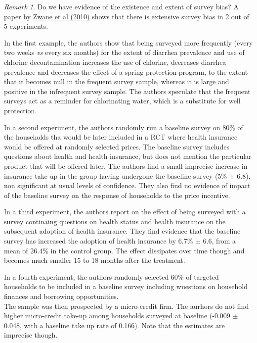 \documentclass[
]{book}
\theoremstyle{definition}
\theoremstyle{definition}
\theoremstyle{definition}
\theoremstyle{definition}
\theoremstyle{remark}
\newtheorem*{remark}{Remark}
\begin{document}
\begin{remark}
\iffalse{} {Remark. } \fi{}Do we have evidence of the existence and extent of survey bias?
A paper by \href{https://www.pnas.org/content/108/5/1821.short}{Zwane et al (2010)} shows that there is extensive survey bias in 2 out of 5 experiments.

In the first example, the authors show that being surveyed more frequently (every two weeks \emph{vs} every six months) for the extent of diarrhea prevalence and use of chlorine decontamination increases the use of chlorine, decreases diarrhea prevalence and decreases the effect of a spring protection program, to the extent that it becomes null in the frequent survey sample, whereas it is large and positive in the infrequent survey sample.
The authors speculate that the frequent surveys act as a reminder for chlorinating water, which is a substitute for well protection.

In a second experiment, the authors randomly run a baseline survey on 80\% of the households tha would be later included in a RCT where health insurance would be offered at randomly selected prices.
The baseline survey includes questions about health and health insurance, but does not mention the particular product that will be offered later.
The authors find a small imprecise increase in insurance take up in the group having undergone the baseline survey (5\% \(\pm\) 6.8), non significant at usual levels of confidence.
They also find no evidence of impact of the baseline survey on the response of households to the price incentive.

In a third experiment, the authors report on the effect of being surveyed with a survey continaing questions on health status and health insurance on the subsequent adoption of health insurance.
They find evidence that the baseline survey has increased the adoption of health insurance by 6.7\% \(\pm\) 6.6, from a mean of 26.4\% in the control group.
The effect dissipates over time though and becomes much smaller 15 to 18 months after the treatment.

In a fourth experiment, the authors randomly selected 60\% of targeted households to be included in a baseline survey including wuestions on household finances and borrowing opportunities.\\
The sample was then prospected by a micro-credit firm.
The aurhors do not find higher micro-credit take-up among households surveyed at baseline (-0.009 \(\pm\) 0.048, with a baseline take up rate of 0.166).
Note that the estimates are imprecise though.


\end{remark}
\end{document}
